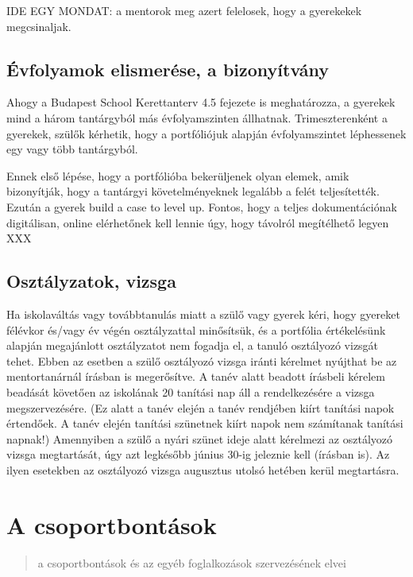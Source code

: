 IDE EGY MONDAT: a mentorok meg azert felelosek, hogy a gyerekekek
megcsinaljak.

\subsection{Évfolyamok elismerése, a
bizonyítvány}\label{uxe9vfolyamok-elismeruxe9se-a-bizonyuxedtvuxe1ny}

Ahogy a Budapest School Kerettanterv 4.5 fejezete is meghatározza, a
gyerekek mind a három tantárgyból más évfolyamszinten állhatnak.
Trimeszterenként a gyerekek, szülők kérhetik, hogy a portfóliójuk
alapján évfolyamszintet léphessenek egy vagy több tantárgyból.

Ennek első lépése, hogy a portfólióba bekerüljenek olyan elemek, amik
bizonyítják, hogy a tantárgyi követelményeknek legalább a felét
teljesítették. Ezután a gyerek build a case to level up. Fontos, hogy a
teljes dokumentációnak digitálisan, online elérhetőnek kell lennie úgy,
hogy távolról megítélhető legyen XXX

\subsection{Osztályzatok, vizsga}\label{osztuxe1lyzatok-vizsga}

Ha iskolaváltás vagy továbbtanulás miatt a szülő vagy gyerek kéri, hogy
gyereket félévkor és/vagy év végén osztályzattal minősítsük, és a
portfólia értékelésünk alapján megajánlott osztályzatot nem fogadja el,
a tanuló osztályozó vizsgát tehet. Ebben az esetben a szülő osztályozó
vizsga iránti kérelmet nyújthat be az mentortanárnál írásban is
megerősítve. A tanév alatt beadott írásbeli kérelem beadását követően az
iskolának 20 tanítási nap áll a rendelkezésére a vizsga megszervezésére.
(Ez alatt a tanév elején a tanév rendjében kiírt tanítási napok
értendőek. A tanév elején tanítási szünetnek kiírt napok nem számítanak
tanítási napnak!) Amennyiben a szülő a nyári szünet ideje alatt
kérelmezi az osztályozó vizsga megtartását, úgy azt legkésőbb június
30-ig jeleznie kell (írásban is). Az ilyen esetekben az osztályozó
vizsga augusztus utolsó hetében kerül megtartásra.

\section{A csoportbontások}\label{a-csoportbontuxe1sok}

\begin{quote}
a csoportbontások és az egyéb foglalkozások szervezésének elvei
\end{quote}

